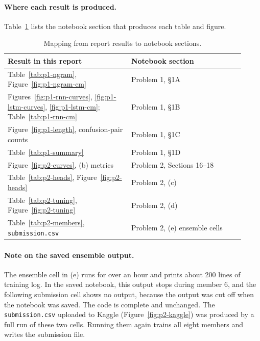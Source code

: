 \documentclass[11pt,a4paper]{article}
\begin{document}
\paragraph{Where each result is produced.}
Table~\ref{tab:map} lists the notebook section that produces each table and figure.
\begin{table}[H]
    \centering
    \caption{Mapping from report results to notebook sections.}
    \label{tab:map}
    \small
    \begin{tabular}{p{0.48\linewidth}p{0.44\linewidth}}
        \toprule
        Result in this report & Notebook section\\
        \midrule
        Table~\ref{tab:p1-ngram}, Figure~\ref{fig:p1-ngram-cm} & Problem 1, \S1A\\
        Figures~\ref{fig:p1-rnn-curves}, \ref{fig:p1-lstm-curves}, \ref{fig:p1-lstm-cm}; Table~\ref{tab:p1-rnn-cm} & Problem 1, \S1B\\
        Figure~\ref{fig:p1-length}, confusion-pair counts & Problem 1, \S1C\\
        Table~\ref{tab:p1-summary} & Problem 1, \S1D\\
        Figure~\ref{fig:p2-curves}, (b) metrics & Problem 2, Sections 16--18\\
        Table~\ref{tab:p2-heads}, Figure~\ref{fig:p2-heads} & Problem 2, (c)\\
        Table~\ref{tab:p2-tuning}, Figure~\ref{fig:p2-tuning} & Problem 2, (d)\\
        Table~\ref{tab:p2-members}, \texttt{submission.csv} & Problem 2, (e) ensemble cells\\
        \bottomrule
    \end{tabular}
\end{table}

\paragraph{Note on the saved ensemble output.}
The ensemble cell in (e) runs for over an hour and prints about 200
lines of training log. In the saved notebook, this output stops during
member 6, and the following submission cell shows no output, because
the output was cut off when the notebook was saved. The code is
complete and unchanged. The \texttt{submission.csv} uploaded to Kaggle
(Figure~\ref{fig:p2-kaggle}) was produced by a full run of these two
cells. Running them again trains all eight members and writes the
submission file.
\end{document}

